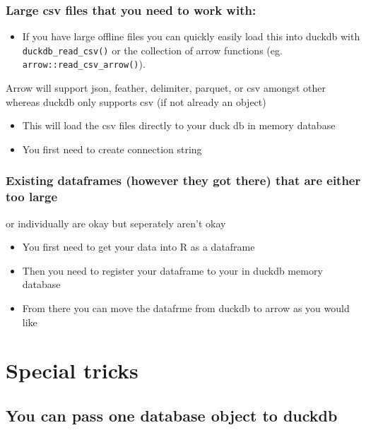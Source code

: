 \documentclass[
  letterpaper,
  DIV=11,
  numbers=noendperiod]{scrreprt}
\providecommand{\tightlist}{%
  \setlength{\itemsep}{0pt}\setlength{\parskip}{0pt}}\usepackage{longtable,booktabs,array}
\begin{document}
\subsection{Large csv files that you need to work
with:}\label{large-csv-files-that-you-need-to-work-with}

\begin{itemize}
\tightlist
\item
  If you have large offline files you can quickly easily load this into
  duckdb with \texttt{duckdb\_read\_csv()} or the collection of arrow
  functions (eg. \texttt{arrow::read\_csv\_arrow()}).
\end{itemize}

Arrow will support json, feather, delimiter, parquet, or csv amongst
other whereas duckdb only supports csv (if not already an object)

\begin{itemize}
\tightlist
\item
  This will load the csv files directly to your duck db in memory
  database
\item
  You first need to create connection string
\end{itemize}

\subsection{Existing dataframes (however they got there) that are either
too
large}\label{existing-dataframes-however-they-got-there-that-are-either-too-large}

or individually are okay but seperately aren't okay

\begin{itemize}
\tightlist
\item
  You first need to get your data into R as a dataframe
\item
  Then you need to register your dataframe to your in duckdb memory
  database
\item
  From there you can move the datafrme from duckdb to arrow as you would
  like
\end{itemize}

\chapter{Special tricks}\label{special-tricks}

\section{You can pass one database object to
duckdb}\label{you-can-pass-one-database-object-to-duckdb}
\end{document}
